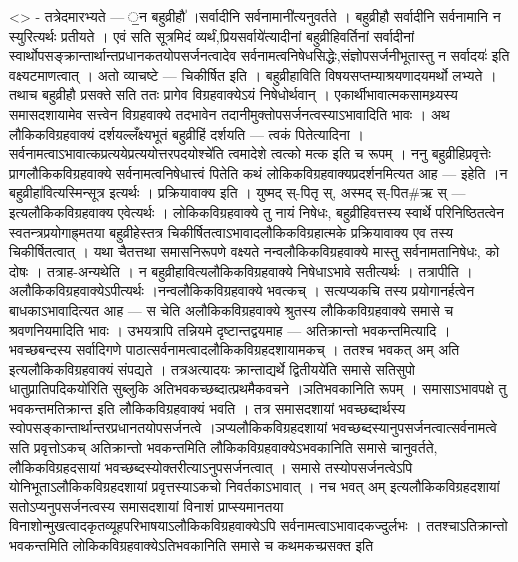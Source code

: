\textless{}\textgreater{} - तत्रेदमारभ्यते --- ॒न बहुव्रीहौ॑ ।सर्वादीनि
सर्वनामानी॑त्यनुवर्तते । बहुव्रीहौ सर्वादीनि सर्वनामानि न स्युरित्यर्थः
प्रतीयते । एवं सति सूत्रमिदं व्यर्थं,प्रियसर्वाये॑त्यादीनां
बहुव्रीहिवर्तिनां सर्वादीनां
स्वार्थोपसङ्क्रान्तार्थान्तप्रधानकतयोपसर्जनत्वादेव
सर्वनामत्वनिषेधसिद्धेः,संज्ञोपसर्जनीभूतास्तु न सर्वादयः॑ इति
वक्ष्यटमाणत्वात् । अतो व्याचष्टे --- चिकीर्षित इति । बहुव्रीहाविति
विषयसप्तम्याश्रयणादयमर्थो लभ्यते । तथाच बहुव्रीहौ प्रसक्ते सति ततः
प्रागेव विग्रहवाक्येऽयं निषेधोर्थवान् । एकार्थीभावात्मकसामथ्र्यस्य
समासदशायामेव सत्त्वेन विग्रहवाक्ये तदभावेन
तदानीमुक्तोपसर्जनत्वस्याऽभावादिति भावः । अथ लौकिकविग्रहवाक्यं
दर्शयल्लँक्ष्यभूतं बहुव्रीहिं दर्शयति --- त्वकं पितेत्यादिना ।
सर्वनामत्वाऽभावात्कप्रत्ययेप्रत्ययोत्तरपदयोश्चे॑ति त्वमादेशे त्वत्को
मत्क इति च रूपम् । ननु बहुव्रीहिप्रवृत्तेः प्रागलौकिकविग्रहवाक्ये
सर्वनामत्वनिषेधात्त्वं पितेति कथं लोकिकविग्रहवाक्यप्रदर्शनमित्यत आह ---
इहेति ।न बहुव्रीहा॑वित्यस्मिन्सूत्र इत्यर्थः । प्रक्रियावाक्य इति ।
युष्मद् स्-पितृ स्, अस्मद् स्-पित\#ऋ स् --- इत्यलौकिकविग्रहवाक्य
एवेत्यर्थः । लोकिकविग्रहवाक्ये तु नायं निषेधः, बहुव्रीहिवत्तस्य स्वार्थे
परिनिष्ठितत्वेन स्वतन्त्रप्रयोगाह्र्मतया बहुव्रीहेस्तत्र
चिकीर्षितत्वाऽभावादलौकिकविग्रहात्मके प्रक्रियावाक्य एव तस्य
चिकीर्षितत्वात् । यथा चैतत्तथा समासनिरूपणे वक्ष्यते
नन्वलौकिकविग्रहवाक्ये मास्तु सर्वनामतानिषेधः, को दोषः । तत्राह-अन्यथेति
। न बहुव्रीहावित्यलौकिकविग्रहवाक्ये निषेधाऽभावे सतीत्यर्थः । तत्रापीति ।
अलौकिकविग्रहवाक्येऽपीत्यर्थः ।नन्वलौकिकविग्रहवाक्ये भवत्कच् । सत्यप्यकचि
तस्य प्रयोगानर्हत्वेन बाधकाऽभावादित्यत आह --- स चेति अलौकिकविग्रहवाक्ये
श्रुतस्य लौकिकविग्रहवाक्ये समासे च श्रवणनियमादिति भावः । उभयत्रापि
तन्नियमे दृष्टान्तद्वयमाह --- अतिक्रान्तो भवकन्तमित्यादि । भवच्छबन्दस्य
सर्वादिगणे पाठात्सर्वनामत्वादलौकिकविग्रहदशायामकच् । ततश्च भवकत् अम् अति
इत्यलौकिकविग्रहवाक्यं संपद्यते । तत्रअत्यादयः क्रान्ताद्यर्थे
द्वितीयये॑ति समासे सतिसुपो धातुप्रातिपदिकयो॑रिति सुब्लुकि
अतिभवकच्छब्दात्प्रथमैकवचने ।ञतिभवकानिति रूपम् । समासाऽभावपक्षे तु
भवकन्तमतिक्रान्त इति लौकिकविग्रहवाक्यं भवति । तत्र समासदशायां
भवच्छब्दार्थस्य स्वोपसङ्कान्तार्थान्तरप्रधानतयोपसर्जनत्वे
।ञप्यलौकिकविग्रहदशायां भवच्छब्दस्यानुपसर्जनत्वात्सर्वनामत्वे सति
प्रवृत्तोऽकच् अतिक्रान्तो भवकन्तमिति लौकिकविग्रहवाक्येऽभवकानिति समासे
चानुवर्तते, लौकिकविग्रहदसायां भवच्छब्दस्योक्तरीत्याऽनुपसर्जनत्वात् ।
समासे तस्योपसर्जनत्वेऽपि योनिभूताऽलौकिकविग्रहदशायां प्रवृत्तस्याऽकचो
निवर्तकाऽभावात् । नच भवत् अम् इत्यलौकिकविग्रहदशायां
सतोऽप्यनुपसर्जनत्वस्य समासदशायां विनाशं प्राप्स्यमानतया
विनाशोन्मुखत्वादकृतव्यूहपरिभाषयाऽलौकिकविग्रहवाक्येऽपि
सर्वनामत्वाऽभावादकज्दुर्लभः । ततश्चाऽतिक्रान्तो भवकन्तमिति
लोकिकविग्रहवाक्येऽतिभवकानिति समासे च कथमकच्प्रसक्त इति
